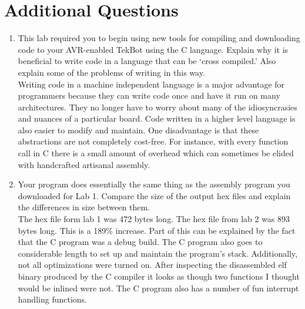 \documentclass[12pt,letterpaper]{article}
\begin{document}
\section{Additional Questions}
\begin{enumerate}
    \item This lab required you to begin using new tools for compiling and
    downloading code to your AVR-enabled TekBot using the C language. Explain
    why it is beneficial to write code in a language that can be ‘cross
    compiled.’ Also explain some of the problems of writing in this way.\\

    Writing code in a machine independent language is a major advantage for
    programmers because they can write code once and have it run on many
    architectures. They no longer have to worry about many of the
    idiosyncrasies and nuances of a particular board. Code written in a higher
    level language is also easier to modify and maintain. One disadvantage is
    that these abstractions are not completely cost-free. For instance, with
    every function call in C there is a small amount of overhead which can
    sometimes be elided with handcrafted artisanal assembly.

    \item Your program does essentially the same thing as the assembly program
    you downloaded for Lab 1. Compare the size of the output hex files and
    explain the differences in size between them.\\

    The hex file form lab 1 was 472 bytes long. The hex file from lab 2 was 893
    bytes long. This is a 189\% increase. Part of this can be explained by the
    fact that the C program was a debug build. The C program also goes to
    considerable length to set up and maintain the program's stack.
    Additionally, not all optimizations were turned on. After inspecting the
    disassembled elf binary produced by the C compiler it looks as though two
    functions I thought would be inlined were not. The C program also has a
    number of fun interrupt handling functions.

\end{enumerate}
\end{document}

